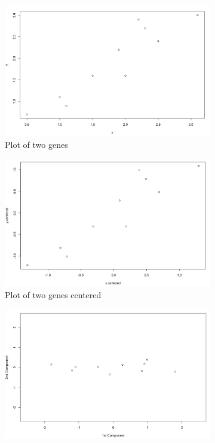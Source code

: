 \documentclass[11pt, oneside]{article}   	%
\begin{document}
\begin{figure}[!h]
	\centering
	\begin{subfigure}{.45\textwidth}
		\includegraphics[width=\textwidth]{example1-plot-two-genes}
		\caption{Plot of two genes}
		\label{fig:PlotTwoGenes}
	\end{subfigure}
	\begin{subfigure}{0.45\textwidth}
		\includegraphics[width=\textwidth]{example1-plot-two-genes-centered}
		\caption{Plot of two genes centered}
		\label{fig:PlotTwoGenesCentered}
	\end{subfigure}
	\begin{subfigure}{0.45\textwidth}
		\includegraphics[width=\textwidth]{example1_plot_2PC}

\end{subfigure}
\end{figure}
\end{document}
